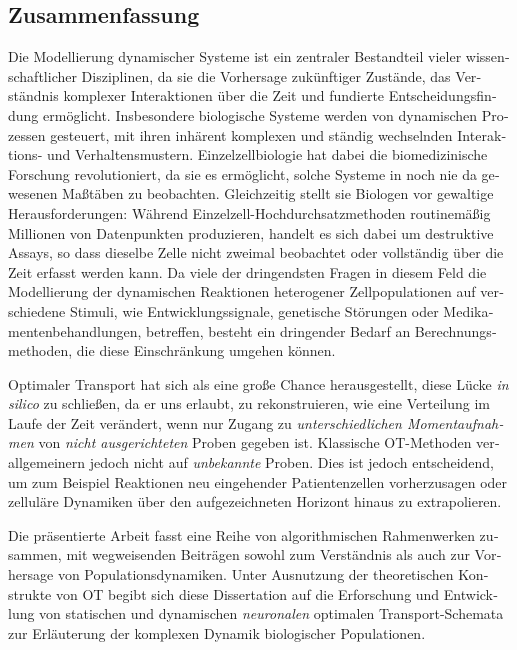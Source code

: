 \begin{otherlanguage}{ngerman}
\chapter*{Zusammenfassung}

Die Modellierung dynamischer Systeme ist ein zentraler Bestandteil vieler wissenschaftlicher Disziplinen, da sie die Vorhersage zuk{\"u}nftiger Zust{\"a}nde, das Verst{\"a}ndnis komplexer Interaktionen {\"u}ber die Zeit und fundierte Entscheidungsfindung erm{\"o}glicht. Insbesondere biologische Systeme werden von dynamischen Prozessen gesteuert, mit ihren inh{\"a}rent komplexen und st{\"a}ndig wechselnden Interaktions- und Verhaltensmustern. Einzelzellbiologie hat dabei die biomedizinische Forschung revolutioniert, da sie es erm{\"o}glicht, solche Systeme in noch nie da gewesenen Ma{\ss}t{\"a}ben zu beobachten. Gleichzeitig stellt sie Biologen vor gewaltige Herausforderungen: W{\"a}hrend Einzelzell-Hochdurchsatzmethoden routinem{\"a}{\ss}ig Millionen von Datenpunkten produzieren, handelt es sich dabei um destruktive Assays, so dass dieselbe Zelle nicht zweimal beobachtet oder vollst{\"a}ndig {\"u}ber die Zeit erfasst werden kann. Da viele der dringendsten Fragen in diesem Feld die Modellierung der dynamischen Reaktionen heterogener Zellpopulationen auf verschiedene Stimuli, wie Entwicklungssignale, genetische St{\"o}rungen oder Medikamentenbehandlungen, betreffen, besteht ein dringender Bedarf an Berechnungsmethoden, die diese Einschr{\"a}nkung umgehen k{\"o}nnen.

Optimaler Transport hat sich als eine gro{\ss}e Chance herausgestellt, diese L{\"u}cke \textit{in silico} zu schlie{\ss}en, da er uns erlaubt, zu rekonstruieren, wie eine Verteilung im Laufe der Zeit ver{\"a}ndert, wenn nur Zugang zu \emph{unterschiedlichen Momentaufnahmen} von \emph{nicht ausgerichteten} Proben gegeben ist. Klassische OT-Methoden verallgemeinern jedoch nicht auf \emph{unbekannte} Proben. Dies ist jedoch entscheidend, um zum Beispiel Reaktionen neu eingehender Patientenzellen vorherzusagen oder zellul{\"a}re Dynamiken {\"u}ber den aufgezeichneten Horizont hinaus zu extrapolieren.

Die pr{\"a}sentierte Arbeit fasst eine Reihe von algorithmischen Rahmenwerken zusammen, mit wegweisenden Beitr{\"a}gen sowohl zum Verst{\"a}ndnis als auch zur Vorhersage von Populationsdynamiken. Unter Ausnutzung der theoretischen Konstrukte von OT begibt sich diese Dissertation auf die Erforschung und Entwicklung von statischen und dynamischen \emph{neuronalen} optimalen Transport-Schemata zur Erl{\"a}uterung der komplexen Dynamik biologischer Populationen.


\end{otherlanguage}
